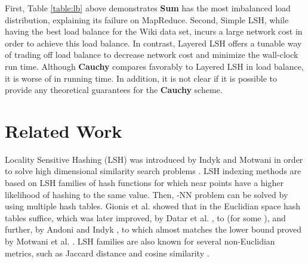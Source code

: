 \documentclass{acm_proc_article-sp}
\numberwithin{equation}{section}
\numberwithin{figure}{section}
\newcommand{\comment}[1]{}
\begin{document}
First, Table \ref{table:lb} above demonstrates {\bf Sum} has the most imbalanced load distribution, explaining its failure on MapReduce. Second, Simple LSH, while having the best load balance for the Wiki data set, incurs a large network cost in order to achieve this load balance. In contrast, Layered LSH offers a tunable way of trading off load balance to decrease network cost and minimize the wall-clock run time. Although {\bf Cauchy} compares favorably to Layered LSH in load balance, it is worse of in running time. In addition, it is not clear if it is possible to provide any theoretical guarantees for the {\bf Cauchy} scheme.



\section{Related Work}
\label{sec:rel}  

\comment{
The methods proposed in the literature for similarity search via nearest neighbors (NN) can be, broadly speaking, classified to data or space partitioning methods and Locality Sensitive Hashing (LSH) techniques. Space partitioning methods, such as -D trees \cite{Bentley:kdtree}, and data partitioning methods, such as R-trees \cite{Rtrees} and SR-trees \cite{SRtrees}, solve the NN problem by pruning the set of candidates for each query using branch and bound techniques. However, they do not scale well with the data dimension, and can in fact be even slower than a brute force sequential scan of the data set when the dimension exceeds  \cite{expt:space:partitioning}. For further details on these methods the reader is referred to the survey by Fodor \cite{Fodor}. 
}

Locality Sensitive Hashing (LSH) was introduced by Indyk and Motwani in order to solve high dimensional similarity search problems \cite{im98}. 
LSH indexing methods are based on LSH families of hash functions for which near points have a higher likelihood of hashing to the same value. Then, -NN problem can be solved by using multiple hash tables. Gionis et al. \cite{gim99} showed that in the Euclidian space  hash tables suffice, which was later improved, by Datar et al. \cite{DIIM04}, to  (for some ), and further, by Andoni and Indyk \cite{AI06}, to  which almost matches the lower bound proved by Motwani et al. \cite{MNP06}. LSH families are also known for several non-Euclidian metrics, such as Jaccard distance \cite{Broder} and cosine similarity \cite{C02}. 
\end{document}
